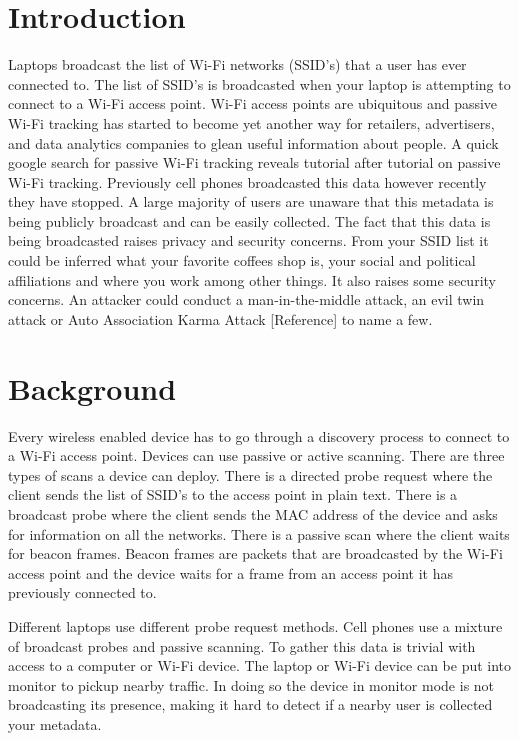 \documentclass[letterpaper,twocolumn,10pt]{article}
\begin{document}
\section{Introduction}
Laptops broadcast the list of Wi-Fi networks (SSID's) that a user has ever connected to. The list of SSID's is broadcasted when your laptop is attempting to connect to a Wi-Fi access point. Wi-Fi access points are ubiquitous and passive Wi-Fi tracking has started to become yet another way for retailers, advertisers, and data analytics companies to glean useful information about people. A quick google search for passive Wi-Fi tracking reveals tutorial after tutorial on passive Wi-Fi tracking. Previously cell phones broadcasted this data however recently they have stopped. A large majority of users are unaware that this metadata is being publicly broadcast and can be easily collected. The fact that this data is being broadcasted raises privacy and security concerns. From your SSID list it could be inferred what your favorite coffees shop is, your social and political affiliations and where you work among other things. It also raises some security concerns. An attacker could conduct a man-in-the-middle attack, an evil twin attack or Auto Association Karma Attack [Reference] to name a few. 

\section{Background}
Every wireless enabled device has to go through a discovery process to connect to a Wi-Fi access point. Devices can use passive or active scanning. There are three types of scans a device can deploy. There is a directed probe request where the client sends the list of SSID's to the access point in plain text. There is a broadcast probe where the client sends the MAC address of the device and asks for information on all the networks. There is a passive scan where the client waits for beacon frames. Beacon frames are packets that are broadcasted by the Wi-Fi access point and the device waits for a frame from an access point it has previously connected to. 

Different laptops use different probe request methods. Cell phones use a mixture of broadcast probes and passive scanning. To gather this data is trivial with access to a computer or Wi-Fi device. The laptop or Wi-Fi device can be put into monitor to pickup nearby traffic. In doing so the device in monitor mode is not broadcasting its presence, making it hard to detect if a nearby user is collected your metadata.
\end{document}
